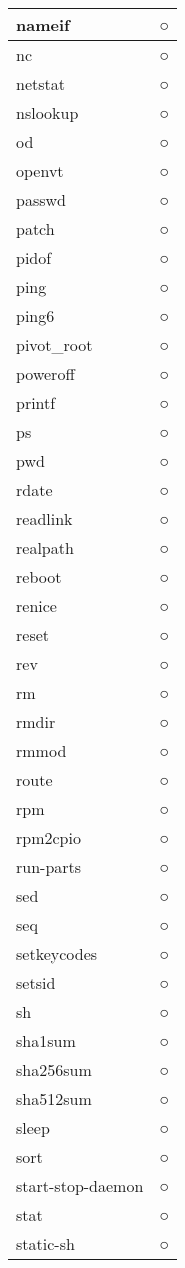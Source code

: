 \begin{longtable}{p{80mm}p{80mm}}
nameif & ○ \\ \hline
nc & ○ \\ \hline
netstat & ○ \\ \hline
nslookup & ○ \\ \hline
od & ○ \\ \hline
openvt & ○ \\ \hline
passwd & ○ \\ \hline
patch & ○ \\ \hline
pidof & ○ \\ \hline
ping & ○ \\ \hline
ping6 & ○ \\ \hline
pivot\_root & ○ \\ \hline
poweroff & ○ \\ \hline
printf & ○ \\ \hline
ps & ○ \\ \hline
pwd & ○ \\ \hline
rdate & ○ \\ \hline
readlink & ○ \\ \hline
realpath & ○ \\ \hline
reboot & ○ \\ \hline
renice & ○ \\ \hline
reset & ○ \\ \hline
rev & ○ \\ \hline
rm & ○ \\ \hline
rmdir & ○ \\ \hline
rmmod & ○ \\ \hline
route & ○ \\ \hline
rpm & ○ \\ \hline
rpm2cpio & ○ \\ \hline
run-parts & ○ \\ \hline
sed & ○ \\ \hline
seq & ○ \\ \hline
setkeycodes & ○ \\ \hline
setsid & ○ \\ \hline
sh & ○ \\ \hline
sha1sum & ○ \\ \hline
sha256sum & ○ \\ \hline
sha512sum & ○ \\ \hline
sleep & ○ \\ \hline
sort & ○ \\ \hline
start-stop-daemon & ○ \\ \hline
stat & ○ \\ \hline
static-sh & ○ \\ \hline

\end{longtable}
